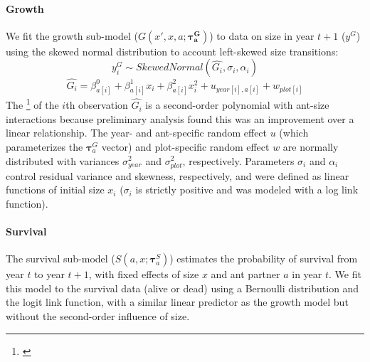 \documentclass[11pt]{article}
\newcommand{\tom}[2]{{\color{red}{#1}}\footnote{\textit{\color{red}{#2}}}}
\begin{document}

\paragraph{Growth}
We fit the growth sub-model ($G(x',x,a;\pmb{\tau^G_{a}})$) to data on size in year $t+1$ ($y^G$) using the skewed normal distribution to account left-skewed size transitions:
$$y_i^G \sim Skewed Normal(\hat{G_i},\sigma_i,\alpha_i) $$
$$\hat{G_i} = \beta^0_{a[i]} + \beta^1_{a[i]} x_i + \beta^2_{a[i]} x_i^2 + u_{year[i],a[i]} + w_{plot[i]} $$
The \tom{mean}{I rewrote this for the skewed normal but I cannot remember if the location parameter is the mean, so you should double check this.} of the $i$th observation $\hat{G_i}$ is a second-order polynomial with ant-size interactions because  preliminary analysis found this was an improvement over a linear relationship. 
The year- and ant-specific random effect $u$ (which parameterizes the $\pmb{\tau}^G_{a}$ vector) and plot-specific random effect $w$ are normally distributed with variances $\sigma^2_{year}$ and $\sigma^2_{plot}$, respectively. 
Parameters $\sigma_i$ and $\alpha_i$  control residual variance and skewness, respectively, and were defined as linear functions of initial size $x_i$ ($\sigma_i$ is strictly positive and was modeled with a log link function). 

\paragraph{Survival}
The survival sub-model ($S(a,x;\pmb{\tau}_{a}^{S})$) estimates the probability of survival from year $t$ to year $t+1$, with fixed effects of size $x$ and ant partner $a$ in year $t$.
We fit this model to the survival data (alive or dead) using a Bernoulli distribution and the logit link function, with a similar linear predictor as the growth model but without the second-order influence of size.
\end{document}
